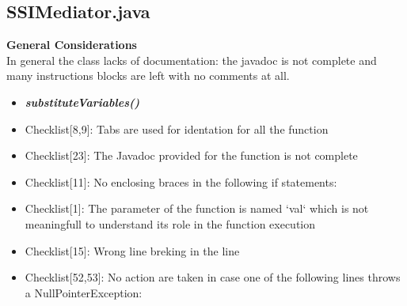 \documentclass[11pt,titlepage]{article} %
\begin{document}
\subsection{SSIMediator.java}
  \textbf{General Considerations} \hfill \\
  In general the class lacks of documentation: the javadoc is not complete and many instructions blocks are left with no comments at all.
  \begin{itemize}
   \item \textbf{\textit{substituteVariables()}}
   \item Checklist[8,9]: Tabs are used for identation for all the function
   \item Checklist[23]: The Javadoc provided for the function is not complete 
   \item Checklist[11]: No enclosing braces in the following if statements:
    
    
    
    
    
   \item Checklist[1]: The parameter of the function is named `val` which is not meaningfull to understand its role in the function execution
   
   \item Checklist[15]: Wrong line breking in the line
    

   \item Checklist[52,53]: No action are taken in case one of the following lines throws a NullPointerException:
    
    
    
    
    

\end{itemize}
\end{document}
